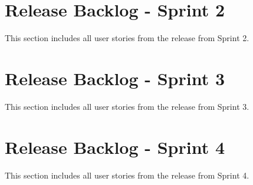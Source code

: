 \section{Release Backlog - Sprint 2}
This section includes all user stories from the release from Sprint 2.

\section{Release Backlog - Sprint 3}
This section includes all user stories from the release from Sprint 3.

\section{Release Backlog - Sprint 4}
This section includes all user stories from the release from Sprint 4.